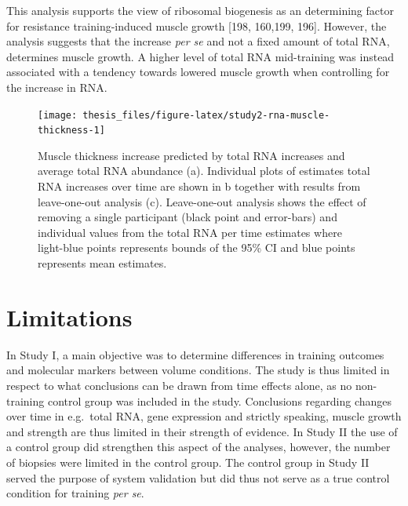 \documentclass[twoside,10pt]{gihclass} %
\begin{document}
This analysis supports the view of ribosomal biogenesis as an determining factor for resistance training-induced muscle growth
{[}198, 160,199,
196{]}.
However, the analysis suggests that the increase \emph{per se} and not a fixed amount of total RNA, determines muscle growth.
A higher level of total RNA mid-training was instead associated with a tendency towards lowered muscle growth when controlling for the increase in RNA.
\begin{figure}

{\centering \texttt{[image: thesis\_files/figure-latex/study2-rna-muscle-thickness-1]} 

}

\caption[Relationship between total RNA and muscle hypertrophy in Study II]{Muscle thickness increase predicted by total RNA increases and average total RNA abundance (a). Individual plots of estimates total RNA increases over time are shown in b together with results from leave-one-out analysis (c). Leave-one-out analysis shows the effect of removing a single participant (black point and error-bars) and individual values from the total RNA per time estimates where light-blue points represents bounds of the 95\% CI and blue points represents mean estimates.}\label{fig:study2-rna-muscle-thickness}
\end{figure}
\hypertarget{limitations}{%
\section{Limitations}\label{limitations}}

In Study I, a main objective was to determine differences in training outcomes and molecular markers between volume conditions. The study is thus limited in respect to what conclusions can be drawn from time effects alone, as no non-training control group was included in the study. Conclusions regarding changes over time in e.g.~total RNA, gene expression and strictly speaking, muscle growth and strength are thus limited in their strength of evidence.
In Study II the use of a control group did strengthen this aspect of the analyses, however, the number of biopsies were limited in the control group. The control group in Study II served the purpose of system validation but did thus not serve as a true control condition for training \emph{per se}.
\end{document}
